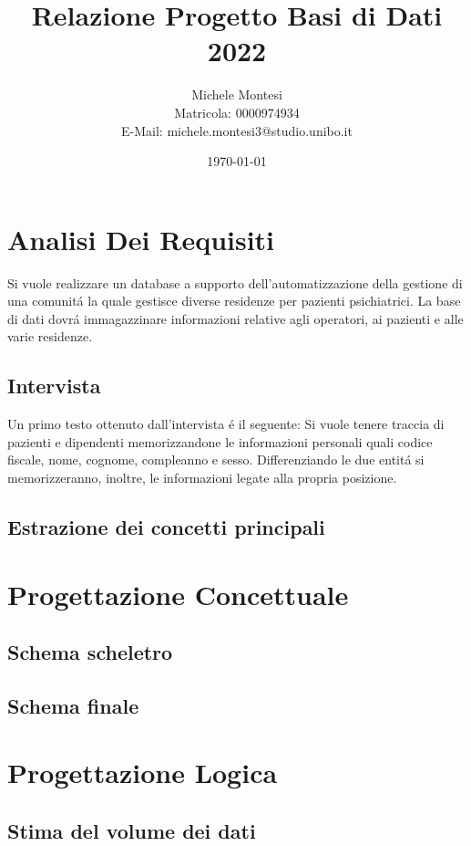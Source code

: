 \documentclass{report}
\title{Relazione Progetto Basi di Dati 2022}
\author{Michele Montesi \\
        Matricola: 0000974934 \\
        E-Mail: michele.montesi3@studio.unibo.it}
\date{\today}
\begin{document}
    
\maketitle
\tableofcontents

\chapter{Analisi Dei Requisiti}
Si vuole realizzare un database a supporto dell'automatizzazione della gestione di una
comunitá la quale gestisce diverse residenze per pazienti psichiatrici.
La base di dati dovrá immagazzinare informazioni relative agli operatori, ai pazienti e
alle varie residenze.

\section{Intervista}
Un primo testo ottenuto dall'intervista é il seguente:
\newline
Si vuole tenere traccia di pazienti e dipendenti memorizzandone le informazioni personali
quali codice fiscale, nome, cognome, compleanno e sesso. Differenziando le due entitá
si memorizzeranno, inoltre, le informazioni legate alla propria posizione. 

\section{Estrazione dei concetti principali}

\chapter{Progettazione Concettuale}

\section{Schema scheletro}

\section{Schema finale}

\chapter{Progettazione Logica}

\section{Stima del volume dei dati}
\end{document}

